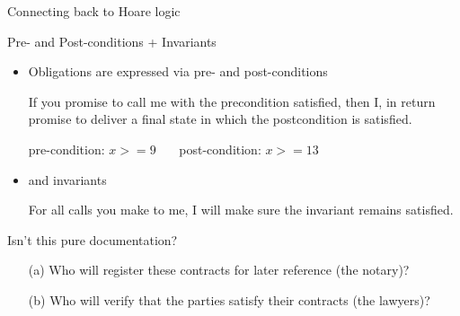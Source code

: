 \begin{frame}{Connecting back to Hoare logic}
  \begin{block}{Pre- and Post-conditions + Invariants}
    \begin{itemize}
    \item Obligations are expressed via pre- and post-conditions
      \begin{boitequote}{}
        If you promise to call me with the precondition satisfied, then I, in
        return promise to deliver a final state in which the postcondition is
        satisfied.
      \end{boitequote}
      \begin{center}
      pre-condition: {$x >= 9$} ~~~post-condition: {$x >= 13$}

      \end{center}
      \vspace{-\baselineskip}
    \item and invariants
      \begin{boitequote}{}
        For all calls you make to me, I will make sure the invariant remains
        satisfied.
      \end{boitequote}
    \end{itemize}
  \end{block}

  \begin{block}{Isn't this pure documentation?}
    \begin{itemize}
    \item[(a)] Who will register these contracts for later reference (the notary)?\\
    \item[(b)] Who will verify that the parties satisfy their contracts (the lawyers)?\\
    \end{itemize}
  \end{block}
\end{frame}
